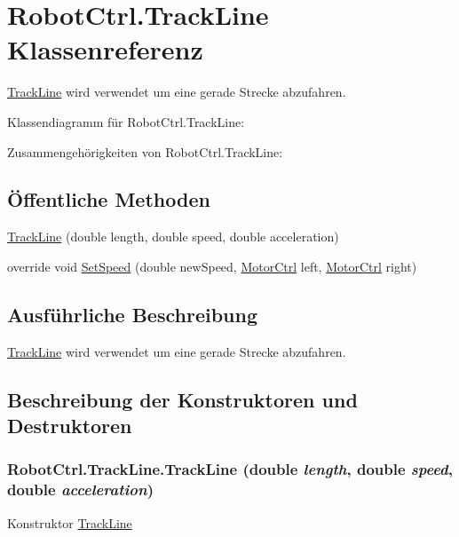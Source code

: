 \hypertarget{class_robot_ctrl_1_1_track_line}{
\section{RobotCtrl.TrackLine Klassenreferenz}
\label{class_robot_ctrl_1_1_track_line}
}


\hyperlink{class_robot_ctrl_1_1_track_line}{TrackLine} wird verwendet um eine gerade Strecke abzufahren.  




Klassendiagramm für RobotCtrl.TrackLine:

Zusammengehörigkeiten von RobotCtrl.TrackLine:\subsection*{Öffentliche Methoden}
\begin{DoxyCompactItemize}
\item 
\hyperlink{class_robot_ctrl_1_1_track_line_ab4ab93433f36792a4748322b94febfc7}{TrackLine} (double length, double speed, double acceleration)
\item 
override void \hyperlink{class_robot_ctrl_1_1_track_line_ad73ae0e8f7aea1765834ab90f5bd6b23}{SetSpeed} (double newSpeed, \hyperlink{class_robot_ctrl_1_1_motor_ctrl}{MotorCtrl} left, \hyperlink{class_robot_ctrl_1_1_motor_ctrl}{MotorCtrl} right)
\end{DoxyCompactItemize}


\subsection{Ausführliche Beschreibung}
\hyperlink{class_robot_ctrl_1_1_track_line}{TrackLine} wird verwendet um eine gerade Strecke abzufahren. 

\subsection{Beschreibung der Konstruktoren und Destruktoren}
\hypertarget{class_robot_ctrl_1_1_track_line_ab4ab93433f36792a4748322b94febfc7}{
\subsubsection[{TrackLine}]{\setlength{\rightskip}{0pt plus 5cm}RobotCtrl.TrackLine.TrackLine (double {\em length}, \/  double {\em speed}, \/  double {\em acceleration})}}
\label{class_robot_ctrl_1_1_track_line_ab4ab93433f36792a4748322b94febfc7}
Konstruktor \hyperlink{class_robot_ctrl_1_1_track_line}{TrackLine}


